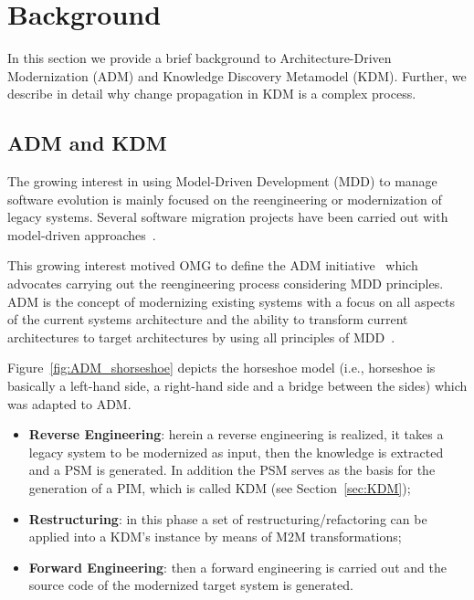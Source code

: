 
\section{Background} %
\label{sec:background}

In this section we provide a brief background to Architecture-Driven Modernization (ADM) and Knowledge Discovery Metamodel (KDM). Further, we describe in detail why change propagation in KDM is a complex process.

\subsection{ADM and KDM}

The growing interest in using Model-Driven Development (MDD) to manage software evolution is mainly focused on the reengineering or modernization of legacy systems. Several software migration projects have been carried out with model-driven approaches~\cite{Heckel2008, Andrade:2005, Reus:2006}. %

This growing interest motived OMG to define the ADM initiative~\cite{1686216} which advocates carrying out the reengineering process considering MDD principles. 
ADM is the concept of modernizing existing systems with a focus on all aspects of the current systems architecture and the ability to transform current architectures to target architectures by using all principles of MDD~\cite[p.~60]{Ulrich:2010:IST:1841736}. 


Figure~\ref{fig:ADM_shorseshoe} depicts the horseshoe model (i.e., horseshoe is basically a left-hand
side, a right-hand side and a bridge between the sides) which was adapted to ADM. %

\begin{itemize}

\item \textbf{Reverse Engineering}: herein a reverse engineering is realized, it takes a legacy system to be modernized as input, then the knowledge is extracted and a PSM is generated. In addition the PSM serves as the basis for the generation of a PIM, which is called KDM (see Section~\ref{sec:KDM});

\item \textbf{Restructuring}: in this phase a set of restructuring/refactoring can be applied into a KDM's instance by means of M2M transformations;

\item \textbf{Forward Engineering}: then a forward engineering is carried out and the source code of the modernized target system is generated.

\end{itemize} 


